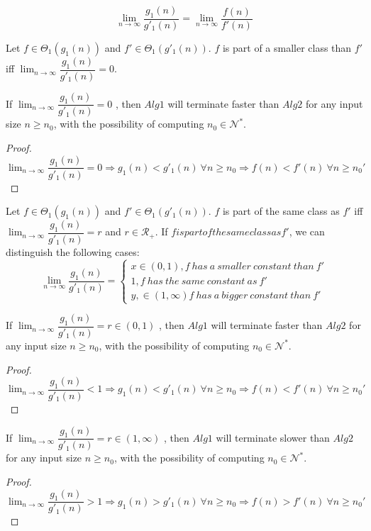 \begin{remark}
\[\lim_{n\to\infty} \dfrac{g_{1}(n)}{g'_{1}(n)} = \lim_{n\to\infty} \dfrac{f(n)}{f'(n)}\]
\end{remark}

\begin{definition}
Let $f \in \Theta_{1}(g_{1}(n))$ and $f' \in \Theta_{1}(g'_{1}(n))$. $f$ is part of a smaller class than $f'$ iff $\lim_{n\to\infty} \dfrac{g_{1}(n)}{g'_{1}(n)} = 0$.
\end{definition}
\begin{lemma}
If  $ \lim_{n\to\infty} \dfrac{g_{1}(n)}{g'_{1}(n)} = 0 $ , then $Alg1$ will terminate faster than $Alg2$ for any input size $n \geq n_{0}$, with the possibility of computing $n_{0} \in \mathcal{N}^{*}$.
\end{lemma}
\begin{proof}
$\lim_{n\to\infty} \dfrac{g_{1}(n)}{g'_{1}(n)} = 0 \Rightarrow g_{1}(n) < g'_{1}(n)\ \forall n \geq n_{0} \Rightarrow f(n) < f'(n) \ \forall n \geq n_{0}'$
\end{proof}

\begin{definition}
Let $f \in \Theta_{1}(g_{1}(n))$ and $f' \in \Theta_{1}(g'_{1}(n))$. $f$ is part of the same class as $f'$ iff $\lim_{n\to\infty} \dfrac{g_{1}(n)}{g'_{1}(n)} = r$ and $r \in \mathcal{R}_{+}$.
If $f is part of the same class as f'$, we can distinguish the following cases:
$$
\lim_{n\to\infty} \dfrac{g_{1}(n)}{g'_{1}(n)} = 
\begin{cases}
x \in (0,1), f\ has\ a\ smaller\ constant\ than\ f' \\
1, f\ has\ the\ same\ constant\ as\ f'\\
y, \in (1,\infty) f\ has\ a\ bigger\ constant\ than\ f'
\end{cases}
$$
\end{definition}

\begin{lemma}
If  $ \lim_{n\to\infty} \dfrac{g_{1}(n)}{g'_{1}(n)} = r \in (0,1) $ , then $Alg1$ will terminate faster than $Alg2$ for any input size $n \geq n_{0}$, with the possibility of computing $n_{0} \in \mathcal{N}^{*}$.
\end{lemma}
\begin{proof}
$\lim_{n\to\infty} \dfrac{g_{1}(n)}{g'_{1}(n)} < 1 \Rightarrow g_{1}(n) < g'_{1}(n)\ \forall n \geq n_{0} \Rightarrow f(n) < f'(n) \ \forall n \geq n_{0}'$
\end{proof}

\begin{lemma}
If  $ \lim_{n\to\infty} \dfrac{g_{1}(n)}{g'_{1}(n)} = r \in (1,\infty) $ , then $Alg1$ will terminate slower than $Alg2$ for any input size $n \geq n_{0}$, with the possibility of computing $n_{0} \in \mathcal{N}^{*}$.
\end{lemma}
\begin{proof}
$\lim_{n\to\infty} \dfrac{g_{1}(n)}{g'_{1}(n)} > 1 \Rightarrow g_{1}(n) > g'_{1}(n)\ \forall n \geq n_{0} \Rightarrow f(n) > f'(n) \ \forall n \geq n_{0}'$
\end{proof}



